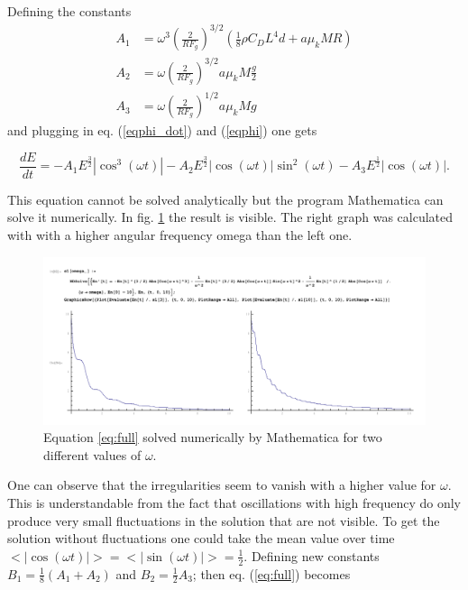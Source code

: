 Defining the constants 
\begin{align}
A_1 &= \omega^3 \left(\frac{2}{R F_g}\right)^{3/2} \left(\frac{1}{8}  \rho  C_D L^4d+a \mu_k M R\right) \nonumber \\
A_2 &= \omega \left(\frac{2}{R F_g}\right)^{3/2}a \mu_k M \frac{g}{2} \nonumber \\
A_3 &= \omega \left(\frac{2}{R F_g}\right)^{1/2} a \mu_k M g \nonumber
\end{align}
 and plugging in eq. (\ref{eqphi_dot}) and (\ref{eqphi}) one gets

\begin{equation} \label{eq:full}
\frac{dE}{dt} = - A_1 E^\frac{3}{2} \left|\cos^3(\omega t)\right| - A_2 E^\frac{3}{2} \left|\cos(\omega t)\right|\sin^2(\omega t) - A_3 E^\frac{1}{2} \left|\cos(\omega t)\right|.
\end{equation}

This equation cannot be solved analytically but the program Mathematica can solve it numerically. In fig. \ref{fig:math} the result is visible. The right graph was calculated with with a higher angular frequency omega than the left one. 


\begin{figure}[h]
\begin{center}
\includegraphics[scale=0.5]{img/results.png}
\end{center}\caption{Equation \ref{eq:full} solved numerically by Mathematica for two different values of $\omega$.}\label{fig:math}
\end{figure}

One can observe that the irregularities seem to vanish with a higher value for $\omega$. This is understandable from the fact that oscillations with high frequency do only produce very small fluctuations in the solution that are not visible. To get the solution without fluctuations one could take the mean value over time $<\left|\cos(\omega t)\right|> = <\left|\sin(\omega t)\right|> = \frac{1}{2}$. Defining new constants $B_1=\frac{1}{8}\left(A_1+A_2\right)$ and $B_2=\frac{1}{2}A_3$; then eq. (\ref{eq:full}) becomes

